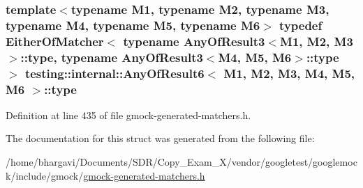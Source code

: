 \subsubsection[{\texorpdfstring{type}{type}}]{\setlength{\rightskip}{0pt plus 5cm}template$<$typename M1, typename M2, typename M3, typename M4, typename M5, typename M6$>$ typedef {\bf Either\+Of\+Matcher}$<$ typename {\bf Any\+Of\+Result3}$<$M1, M2, M3$>$\+::{\bf type}, typename {\bf Any\+Of\+Result3}$<$M4, M5, M6$>$\+::{\bf type} $>$ {\bf testing\+::internal\+::\+Any\+Of\+Result6}$<$ M1, M2, M3, M4, M5, M6 $>$\+::{\bf type}}\hypertarget{structtesting_1_1internal_1_1_any_of_result6_a15837eb05d9ac5a76c20d344a4988dd1}{}\label{structtesting_1_1internal_1_1_any_of_result6_a15837eb05d9ac5a76c20d344a4988dd1}


Definition at line 435 of file gmock-\/generated-\/matchers.\+h.



The documentation for this struct was generated from the following file\+:\begin{DoxyCompactItemize}
\item 
/home/bhargavi/\+Documents/\+S\+D\+R/\+Copy\+\_\+\+Exam\+\_\+X/vendor/googletest/googlemock/include/gmock/\hyperlink{gmock-generated-matchers_8h}{gmock-\/generated-\/matchers.\+h}\end{DoxyCompactItemize}
